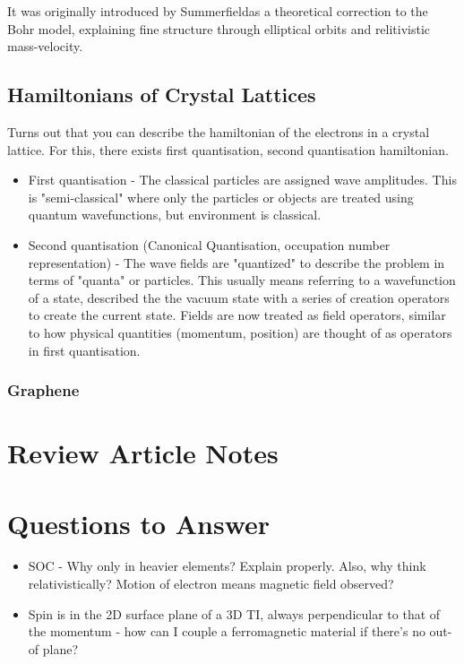 \documentclass{article} %
\begin{document}
It was originally introduced by Summerfieldas a theoretical correction to the Bohr  model, explaining fine structure through elliptical orbits and relitivistic mass-velocity. 

\subsection{Hamiltonians of Crystal Lattices}
Turns out that you can describe the hamiltonian of the electrons in a crystal lattice.  For this, there exists first quantisation, second quantisation hamiltonian.

\begin{itemize}
	\item First quantisation - The classical particles are assigned wave amplitudes. This is "semi-classical" where only the particles or objects are treated using quantum wavefunctions, but environment is classical. 
	\item Second quantisation (Canonical Quantisation, occupation number representation) - The wave fields are "quantized" to describe the problem in terms of "quanta" or particles. This usually means referring to a wavefunction of a state, described the the vacuum state with a series of creation operators to create the current state.
	Fields are now treated as field operators, similar to how physical quantities (momentum, position) are thought of as operators in first quantisation. 
\end{itemize}

\subsubsection{Graphene}


\section{Review Article Notes}



	


\section{Questions to Answer}
	\begin{itemize}
		\item SOC - Why only in heavier elements? Explain properly. Also, why think relativistically? Motion of electron means magnetic field observed?
		\item Spin is in the 2D surface plane of a 3D TI, always perpendicular to that of the momentum - how can I couple a ferromagnetic material if there's no out-of plane?
	\end{itemize}



\end{document}
